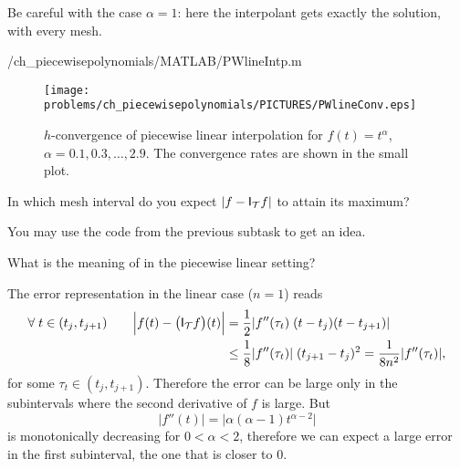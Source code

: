 \begin{problem}
\begin{subproblem}[3]
\begin{solution}
Be careful with the case $\alpha=1$: here the interpolant gets exactly the solution, with every mesh.


{\problems/ch_piecewisepolynomials/MATLAB/PWlineIntp.m}


\begin{figure}[htb]
\caption{$h$-convergence of piecewise linear interpolation for $f(t)= t^\alpha$, $\alpha=0.1,0.3,\ldots,2.9$.
The convergence rates are shown in the small plot.}
\label{fig:PWlineConv}\begin{center}\texttt{[image: \\problems/ch\_piecewisepolynomials/PICTURES/PWlineConv.eps]}\end{center}\end{figure}
\end{solution}
\end{subproblem}






\begin{subproblem}[3]\label{subprb:GradedMeshes_3}
In which mesh interval do you expect $|f-\mathsf{I}_{{\cal T}}f|$ to attain its maximum?

\begin{hint}
You may use the code from the previous subtask to get an idea.
\end{hint}
\begin{hint}
What is the meaning of   in the piecewise linear setting? 
\end{hint}

\begin{solution}The error representation  in the linear case ($n=1$) reads
\begin{align*}
 \forall\;t\in(t_j,t_{j+1})\qquad  \Big|f(t)-\big(\mathsf{I}_{{\cal T}}f\big)(t)\Big| &=\frac12 |f''(\tau_t) \; (t-t_j)(t-t_{j+1})| \\
&\leq \frac18 |f''(\tau_t)|\; (t_{j+1}-t_{j})^2 = \frac1{8n^2}|f''(\tau_t)|,
\end{align*}
for some $\tau_t\in(t_j,t_{j+1})$.
Therefore the error can be large only in the subintervals where the second derivative of $f$ is large.
But
$$|f''(t)|=\big|\alpha(\alpha-1)t^{\alpha-2}\big|$$
is monotonically decreasing for $0<\alpha<2$, therefore we can expect a large error in the first subinterval, the one that is closer to $0$.


\end{solution}
\end{subproblem}
\end{problem}
